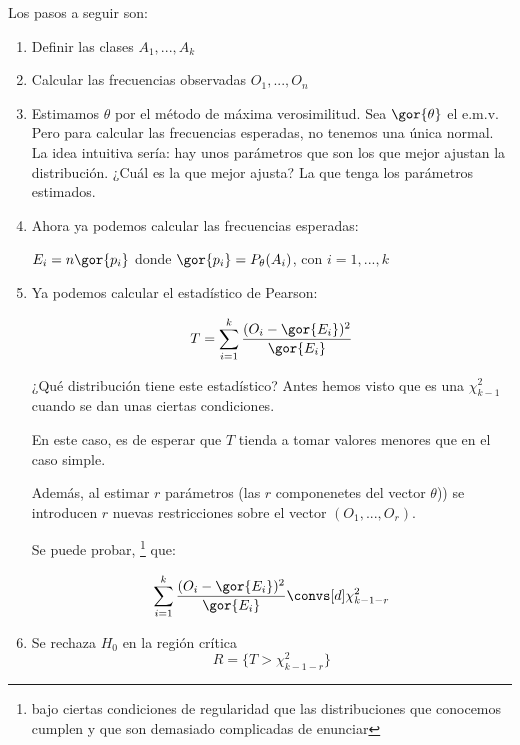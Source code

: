 Los pasos a seguir son:
\begin{enumerate}
	\item Definir las clases $A_1,...,A_k$
	\item Calcular las frecuencias observadas $O_1,...,O_n$
	\item Estimamos $\theta$ por el método de máxima verosimilitud. Sea $\gor{\theta}$ el e.m.v.
	\subitem Pero para calcular las frecuencias esperadas, no tenemos una única normal. La idea intuitiva sería: hay unos parámetros que son los que mejor ajustan la distribución. ¿Cuál es la que mejor ajusta? La que tenga los parámetros estimados.
	\item Ahora ya podemos calcular las frecuencias esperadas:

	$E_i = n\gor{p_i}$ donde $\gor{p_i} = P_{\theta}(A_i)$, con $i=1,...,k$
	\item Ya podemos calcular el estadístico de Pearson:

	\[
	T= \sum_{i=1}^k \frac{(O_i - \gor{E_i})^2}{\gor{E_i}}
	\]

	\subitem ¿Qué distribución tiene este estadístico? Antes hemos visto que es una $\chi^2_{k-1}$ cuando se dan unas ciertas condiciones.

	En este caso, es de esperar que $T$ tienda a tomar valores menores que en el caso simple.

	Además, al estimar $r$ parámetros (las $r$ componenetes del vector $\theta$)) se introducen $r$ nuevas restricciones sobre el vector $(O_1,...,O_r)$.

Se puede probar, \footnote{bajo ciertas condiciones de regularidad que las distribuciones que conocemos cumplen y que son demasiado complicadas de enunciar} que:

\[
	\sum_{i=1}^k \frac{(O_i - \gor{E_i})^2}{\gor{E_i}} \convs[d] \chi^2_{k-1-r}
\]

	\item Se rechaza $H_0$ en  la región crítica \[R = \{ T > \chi^2_{k-1-r}\}\]
\end{enumerate}

